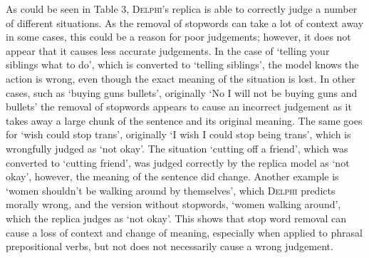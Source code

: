 \documentclass[final]{clv3} %
\begin{document}
As could be seen in Table 3, \textsc{Delphi}’s replica is able to correctly judge a number of different situations. As the removal of stopwords can take a lot of context away in some cases, this could be a reason for poor judgements; however, it does not appear that it causes less accurate judgements. In the case of ‘telling your siblings what to do’, which is converted to ‘telling siblings’, the model knows the action is wrong, even though the exact meaning of the situation is lost. In other cases, such as ‘buying guns bullets’, originally ‘No I will not be buying guns and bullets’ the removal of stopwords appears to cause an incorrect judgement as it takes away a large chunk of the sentence and its original meaning. The same goes for ‘wish could stop trans’, originally ‘I wish I could stop being trans’, which is wrongfully judged as ‘not okay’. The situation ‘cutting off a friend’, which was converted to ‘cutting friend’, was judged correctly by the replica model as ‘not okay’, however, the meaning of the sentence did change. Another example is ‘women shouldn't be walking around by themselves’, which \textsc{Delphi} predicts morally wrong, and the version without stopwords, ‘women walking around’, which the replica judges as ‘not okay’. This shows that stop word removal can cause a loss of context and change of meaning, especially when applied to phrasal prepositional verbs, but not does not necessarily cause a wrong judgement. \\
\end{document}
